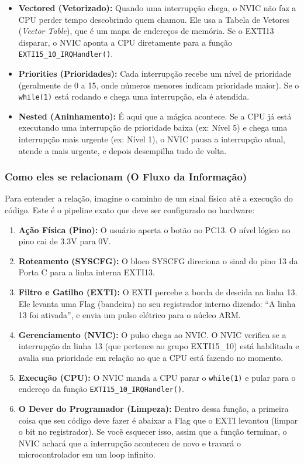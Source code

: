 \documentclass[12pt,a4paper]{article}
\begin{document}
\begin{itemize}
    \item \textbf{Vectored (Vetorizado):} Quando uma interrupção chega, o NVIC não faz a CPU perder tempo descobrindo quem chamou. Ele usa a Tabela de Vetores (\textit{Vector Table}), que é um mapa de endereços de memória. Se o EXTI13 disparar, o NVIC aponta a CPU diretamente para a função \texttt{EXTI15\_10\_IRQHandler()}.
    
    
    
    \item \textbf{Priorities (Prioridades):} Cada interrupção recebe um nível de prioridade (geralmente de 0 a 15, onde números menores indicam prioridade maior). Se o \texttt{while(1)} está rodando e chega uma interrupção, ela é atendida.
    \item \textbf{Nested (Aninhamento):} É aqui que a mágica acontece. Se a CPU já está executando uma interrupção de prioridade baixa (ex: Nível 5) e chega uma interrupção mais urgente (ex: Nível 1), o NVIC pausa a interrupção atual, atende a mais urgente, e depois desempilha tudo de volta.
    
    
\end{itemize}

\subsubsection{Como eles se relacionam (O Fluxo da Informação)}
Para entender a relação, imagine o caminho de um sinal físico até a execução do código. Este é o pipeline exato que deve ser configurado no hardware:
\begin{enumerate}
    \item \textbf{Ação Física (Pino):} O usuário aperta o botão no PC13. O nível lógico no pino cai de 3.3V para 0V.
    \item \textbf{Roteamento (SYSCFG):} O bloco SYSCFG direciona o sinal do pino 13 da Porta C para a linha interna EXTI13.
    \item \textbf{Filtro e Gatilho (EXTI):} O EXTI percebe a borda de descida na linha 13. Ele levanta uma Flag (bandeira) no seu registrador interno dizendo: ``A linha 13 foi ativada'', e envia um pulso elétrico para o núcleo ARM.
    \item \textbf{Gerenciamento (NVIC):} O pulso chega ao NVIC. O NVIC verifica se a interrupção da linha 13 (que pertence ao grupo EXTI15\_10) está habilitada e avalia sua prioridade em relação ao que a CPU está fazendo no momento.
    \item \textbf{Execução (CPU):} O NVIC manda a CPU parar o \texttt{while(1)} e pular para o endereço da função \texttt{EXTI15\_10\_IRQHandler()}.
    \item \textbf{O Dever do Programador (Limpeza):} Dentro dessa função, a primeira coisa que seu código deve fazer é abaixar a Flag que o EXTI levantou (limpar o bit no registrador). Se você esquecer isso, assim que a função terminar, o NVIC achará que a interrupção aconteceu de novo e travará o microcontrolador em um loop infinito.
\end{enumerate}
\end{document}
